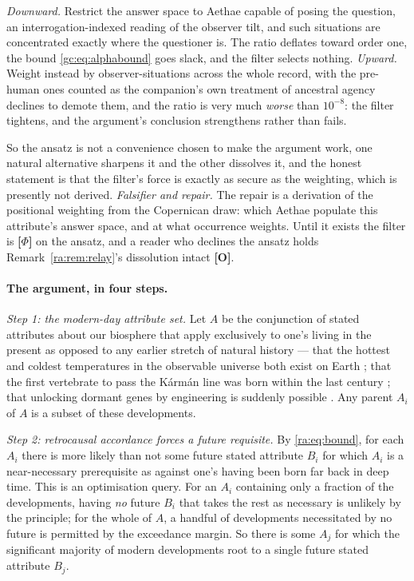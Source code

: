 \documentclass[11pt]{article}
\numberwithin{equation}{section}
\theoremstyle{plain}
\theoremstyle{definition}
\theoremstyle{remark}
\begin{document}
\emph{Downward.} Restrict the answer space to Aethae capable of posing
the question, an interrogation-indexed reading of the observer tilt, and such situations are concentrated exactly where the questioner
is. The ratio deflates toward order one, the bound
\eqref{gc:eq:alphabound} goes slack, and the filter selects nothing. \emph{Upward.} Weight instead by observer-situations across the whole
record, with the pre-human ones counted as the companion's own
treatment of ancestral agency declines to demote them, and the ratio
is very much \emph{worse} than $10^{-8}$: the filter tightens, and the
argument's conclusion strengthens rather than fails.

So the ansatz is not a convenience chosen to make the argument work, one natural alternative sharpens it and the other dissolves it, and
the honest statement is that the filter's force is exactly as secure as
the weighting, which is presently not derived. \emph{Falsifier and
repair.} The repair is a derivation of the positional weighting from
the Copernican draw: which Aethae populate this attribute's answer
space, and at what occurrence weights. Until it exists the filter is
\textbf{[$\Phi$]} on the ansatz, and a reader who declines the ansatz
holds Remark~\ref{ra:rem:relay}'s dissolution intact \textbf{[O]}.

\paragraph{The argument, in four steps.}

\emph{Step 1: the modern-day attribute set.} Let $A$ be the conjunction
of stated attributes about our biosphere that apply exclusively to
one's living in the present as opposed to any earlier stretch of natural
history --- that the hottest and coldest temperatures in the observable
universe both exist on Earth
\cite{ALICE2012Temperature,Kovachy2015Picokelvin}; that the first
vertebrate to pass the K\'arm\'an line was born within the last century
\cite{burgess2007animals}; that unlocking dormant genes by engineering is
suddenly possible \cite{Pattali2026_CRISPR_epigenome_mod}. Any parent
$A_i$ of $A$ is a subset of these developments.

\emph{Step 2: retrocausal accordance forces a future requisite.} By
\eqref{ra:eq:bound}, for each $A_i$ there is more likely than not some
future stated attribute $B_i$ for which $A_i$ is a near-necessary
prerequisite as against one's having been born far back in deep time.
This is an optimisation query. For an $A_i$ containing only a fraction
of the developments, having \emph{no} future $B_i$ that takes the rest
as necessary is unlikely by the principle; for the whole of $A$, a
handful of developments necessitated by no future is permitted by the
exceedance margin. So there is some $A_j$ for which the significant
majority of modern developments root to a single future stated attribute
$B_j$.
\end{document}
